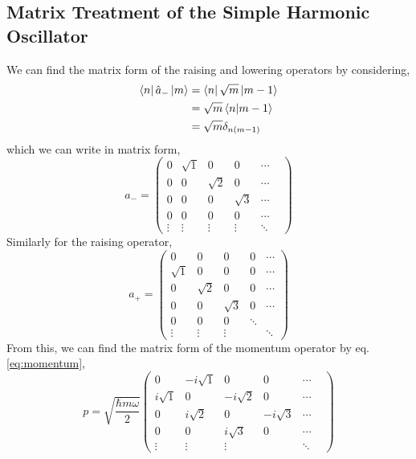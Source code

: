 \documentclass{book}
\begin{document}
\subsection{Matrix Treatment of the Simple Harmonic Oscillator}
We can find the matrix form of the raising and lowering operators by considering,
\begin{equation}
	\begin{split}
		\bra{n}\hat{a}_-\ket{m} & = \bra{n}\sqrt{m}\ket{m-1}\\
		& = \sqrt{m} \braket{n}{m-1} \\
		& = \sqrt{m}\delta_{n(m-1)}
	\end{split}
\end{equation}
which we can write in matrix form,
\begin{equation}
	a_- = \begin{pmatrix}
		0 & \sqrt{1} & 0 & 0 & \cdots \\
		0 & 0 & \sqrt{2} & 0 & \cdots \\
		0 & 0 & 0 & \sqrt{3} & \cdots \\
		0 & 0 & 0 & 0 & \cdots \\
		\vdots & \vdots & \vdots & \vdots & \ddots & 
	\end{pmatrix}
\end{equation}
Similarly for the raising operator,
\begin{equation}
	a_+ = \begin{pmatrix}
		0 & 0 & 0 & 0 & \cdots \\
		\sqrt{1} &0&0&0& \cdots \\
		0 & \sqrt{2} & 0&0& \cdots \\
		0 & 0 & \sqrt{3} & 0 & \cdots \\
		0 & 0 & 0 & \ddots &  \\
		\vdots & \vdots & \vdots & & \ddots
		
	\end{pmatrix}
\end{equation}
From this, we can find the matrix form of the momentum operator by eq. \eqref{eq:momentum},
\begin{equation}
	p = \sqrt{\frac{\hbar m \omega}{2}}\begin{pmatrix}
		0 & -i\sqrt{1} & 0 & 0 & \cdots \\
		i\sqrt{1} & 0 & -i\sqrt{2} & 0 & \cdots \\
		0 & i\sqrt{2} & 0& -i\sqrt{3} & \cdots \\
		0 & 0 & i\sqrt{3} & 0 & \cdots\\
		\vdots & \vdots & \vdots & & \ddots & 
	\end{pmatrix}
\end{equation}
\end{document}
